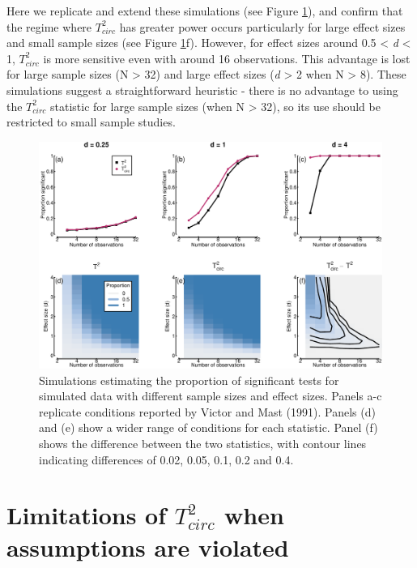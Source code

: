 \documentclass[]{article}
\begin{document}
Here we replicate and extend these simulations (see Figure \ref{fig:powerfig}), and confirm that the regime where \(T^2_{circ}\) has greater power occurs particularly for large effect sizes and small sample sizes (see Figure \ref{fig:powerfig}f). However, for effect sizes around 0.5 \textless{} \emph{d} \textless{} 1, \(T^2_{circ}\) is more sensitive even with around 16 observations. This advantage is lost for large sample sizes (N \textgreater{} 32) and large effect sizes (\emph{d} \textgreater{} 2 when N \textgreater{} 8). These simulations suggest a straightforward heuristic - there is no advantage to using the \(T^2_{circ}\) statistic for large sample sizes (when N \textgreater{} 32), so its use should be restricted to small sample studies.

\begin{figure}

{\centering \includegraphics{manuscript_files/figure-latex/powerfig-1} 

}

\caption{Simulations estimating the proportion of significant tests for simulated data with different sample sizes and effect sizes. Panels a-c replicate conditions reported by Victor and Mast (1991). Panels (d) and (e) show a wider range of conditions for each statistic. Panel (f) shows the difference between the two statistics, with contour lines indicating differences of 0.02, 0.05, 0.1, 0.2 and 0.4.}\label{fig:powerfig}
\end{figure}

\hypertarget{limitations-of-t2_circ-when-assumptions-are-violated}{%
\section{\texorpdfstring{Limitations of \(T^2_{circ}\) when assumptions are violated}{Limitations of T\^{}2\_\{circ\} when assumptions are violated}}\label{limitations-of-t2_circ-when-assumptions-are-violated}}
\end{document}
